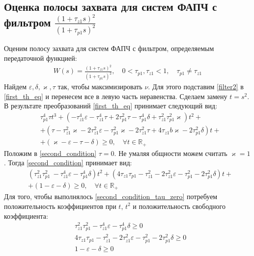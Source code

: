 \documentclass[a4paper,article,14pt]{extarticle}
\begin{document}
\subsection{Оценка полосы захвата для систем ФАПЧ с фильтром $\frac{(1+\tau_{z1}s)^2}{(1+\tau_{p1}s)^2}$}
Оценим полосу захвата для систем ФАПЧ с фильтром, определяемым передаточной функцией:
 \begin{equation}\label{filter2}
 \begin{aligned}
W(s) = \frac{(1+\tau_{z1}s)^2}{(1+\tau_{p1}s)^2}, \quad 0<\tau_{p1},\tau_{z1} < 1, \quad \tau_{p1} \neq \tau_{z1}
 \end{aligned}
\end{equation}
Найдем $\varepsilon, \delta, \varkappa, \tau$ так, чтобы максимизировать $\nu$. Для этого подставим \eqref{filter2} в \eqref{first_th_eq} и перенесем все в левую часть неравенства. Сделаем замену $t = s^2$. В результате преобразований \eqref{first_th_eq} принимает следующий вид:
 \begin{equation}\label{second_condition}
 \begin{aligned}
&\tau_{p1}^4\tau t^3 +(- \tau_{z1}^4\varepsilon - \tau_{z1}^4\tau + 2\tau_{p1}^2\tau- \tau_{p1}^4\delta + \tau_{z1}^2\tau_{p1}^2\varkappa)t^2 +\\
&+( \tau- \tau_{z1}^2\varkappa - 2\tau_{z1}^2\varepsilon - \tau_{p1}^2\varkappa- 2\tau_{z1}^2\tau + 4\tau_{z1}b\varkappa- 2\tau_{p1}^2\delta)t + \\
&+ (\varkappa-\varepsilon - \tau - \delta)  \geqslant 0, \quad \forall t \in \mathbb{R_+}
 \end{aligned}
\end{equation}
Положим в \eqref{second_condition} $\tau = 0$. Не умаляя общности можем считать $\varkappa = 1$. Тогда \eqref{second_condition} принимает вид:
 \begin{equation}\label{second_condition_tau_zero}
 \begin{aligned}
&(\tau_{z1}^2\tau_{p1}^2\ - \tau_{z1}^4\varepsilon - \tau_{p1}^4\delta)t^2 +( 4\tau_{z1}\tau_{p1} - \tau_{z1}^2 - 2\tau_{z1}^2\varepsilon - \tau_{p1}^2 - 2\tau_{p1}^2\delta)t + \\
&+ (1-\varepsilon - \delta)  \geqslant 0, \quad \forall t \in \mathbb{R_+}
 \end{aligned}
\end{equation}
Для того, чтобы выполнялось \eqref{second_condition_tau_zero} потребуем положительность коэффициентов при $t$, $t^2$ и положительность свободного коэффициента: 
 \begin{equation}\label{filter2_1_area}
 \begin{aligned}
&\tau_{z1}^2\tau_{p1}^2 - \tau_{z1}^4\varepsilon - \tau_{p1}^4\delta \geqslant 0\\
&4\tau_{z1}\tau_{p1} - \tau_{z1}^2 - 2\tau_{z1}^2\varepsilon - \tau_{p1}^2 - 2\tau_{p1}^2\delta \geqslant 0\\
&1-\varepsilon - \delta \geqslant 0
 \end{aligned}
\end{equation}
\end{document}
